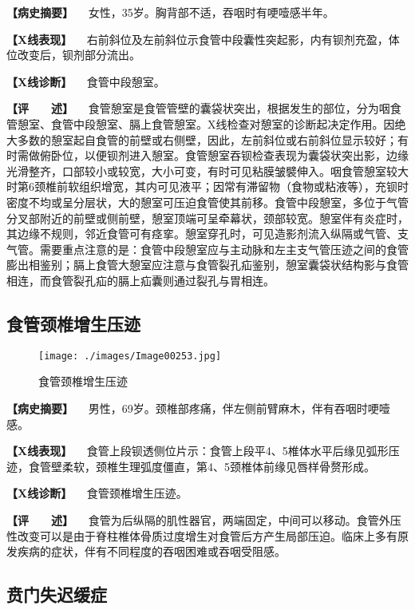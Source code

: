 \textbf{【病史摘要】} 　女性，35岁。胸背部不适，吞咽时有哽噎感半年。

\textbf{【X线表现】}
　右前斜位及左前斜位示食管中段囊性突起影，内有钡剂充盈，体位改变后，钡剂部分流出。

\textbf{【X线诊断】} 　食管中段憩室。

\textbf{【评　　述】}
　食管憩室是食管管壁的囊袋状突出，根据发生的部位，分为咽食管憩室、食管中段憩室、膈上食管憩室。X线检查对憩室的诊断起决定作用。因绝大多数的憩室起自食管的前壁或右侧壁，因此，左前斜位或右前斜位显示较好；有时需做俯卧位，以便钡剂进入憩室。食管憩室吞钡检查表现为囊袋状突出影，边缘光滑整齐，口部较小或较宽，大小可变，有时可见粘膜皱襞伸入。咽食管憩室较大时第6颈椎前软组织增宽，其内可见液平；因常有滞留物（食物或粘液等），充钡时密度不均或呈分层状，大的憩室可压迫食管使其前移。食管中段憩室，多位于气管分叉部附近的前壁或侧前壁，憩室顶端可呈牵幕状，颈部较宽。憩室伴有炎症时，其边缘不规则，邻近食管可有痉挛。憩室穿孔时，可见造影剂流入纵隔或气管、支气管。需要重点注意的是：食管中段憩室应与主动脉和左主支气管压迹之间的食管膨出相鉴别；膈上食管大憩室应注意与食管裂孔疝鉴别，憩室囊袋状结构影与食管相连，而食管裂孔疝的膈上疝囊则通过裂孔与胃相连。

\subsection{食管颈椎增生压迹}

\begin{figure}[!htbp]
 \centering
 \texttt{[image: ./images/Image00253.jpg]}
 \captionsetup{justification=centering}
 \caption{食管颈椎增生压迹}
 \label{fig5-2-10}
  \end{figure} 

\textbf{【病史摘要】}
　男性，69岁。颈椎部疼痛，伴左侧前臂麻木，伴有吞咽时哽噎感。

\textbf{【X线表现】}
　食管上段钡透侧位片示：食管上段平4、5椎体水平后缘见弧形压迹，食管壁柔软，颈椎生理弧度僵直，第4、5颈椎体前缘见唇样骨赘形成。

\textbf{【X线诊断】} 　食管颈椎增生压迹。

\textbf{【评　　述】}
　食管为后纵隔的肌性器官，两端固定，中间可以移动。食管外压性改变可以是由于脊柱椎体骨质过度增生对食管后方产生局部压迫。临床上多有原发疾病的症状，伴有不同程度的吞咽困难或吞咽受阻感。

\subsection{贲门失迟缓症}

